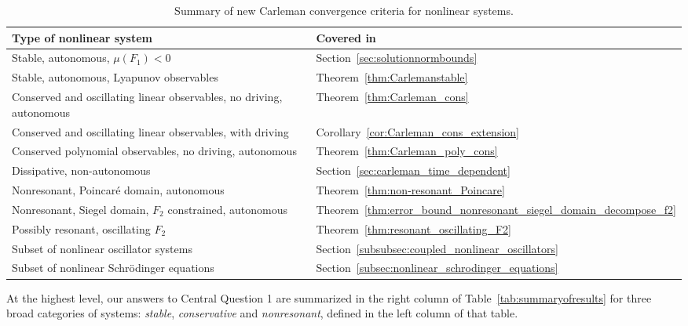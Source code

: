 \documentclass[superscriptaddress,onecolumn,nofootinbib,longbibliography,a4paper,accepted=2026-09-29]{quantumarticle}
\theoremstyle{plain}
\theoremstyle{definition}
\numberwithin{thm}{section}
\numberwithin{assumption}{section}
\numberwithin{lemma}{section}
\numberwithin{prop}{section}
\numberwithin{cor}{section}
\numberwithin{definition}{section}
\numberwithin{rmk}{section}
\numberwithin{equation}{section}
\begin{document}
\begin{table}[h!]
    \centering
    \begin{tabular}{|l|l|}
    \hline
    \textbf{Type of nonlinear system}  &  \textbf{Covered in} \\
    \hline
    Stable, autonomous, $\mu(F_1) <0$  & Section~\ref{sec:solutionnormbounds} \\
    Stable, autonomous, Lyapunov observables  & Theorem~\ref{thm:Carlemanstable} \\
    Conserved and oscillating linear observables, no driving, autonomous & Theorem~\ref{thm:Carleman_cons} \\
    Conserved and oscillating linear observables, with driving & Corollary~\ref{cor:Carleman_cons_extension} \\
    Conserved polynomial observables, no driving, autonomous & Theorem~\ref{thm:Carleman_poly_cons} \\
    Dissipative, non-autonomous & Section~\ref{sec:carleman_time_dependent} \\
    Nonresonant, Poincar\'{e} domain, autonomous & Theorem~\ref{thm:non-resonant_Poincare} \\
    Nonresonant, Siegel domain, $F_2$ constrained, autonomous & Theorem~\ref{thm:error_bound_nonresonant_siegel_domain_decompose_f2} \\
    Possibly resonant, oscillating $F_2$ & Theorem~\ref{thm:resonant_oscillating_F2} \\
    Subset of nonlinear oscillator systems & Section~\ref{subsubsec:coupled_nonlinear_oscillators} \\
    Subset of nonlinear Schr\"{o}dinger equations & Section~\ref{subsec:nonlinear_schrodinger_equations} \\
    \hline
    \end{tabular}
    \caption{Summary of new Carleman convergence criteria for nonlinear systems.}
    \label{tablesummary}
\end{table}

At the highest level, our answers to Central Question 1 are summarized in the right column of Table~\ref{tab:summaryofresults} for three broad categories of systems: \emph{stable}, \emph{conservative} and \emph{nonresonant}, defined in the left column of that table. 
\end{document}
